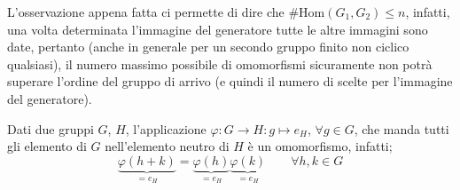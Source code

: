 \documentclass[11pt]{scrartcl}
\begin{document}
L'osservazione appena fatta ci permette di dire che $\#\text{Hom}(G_1,G_2) \leq n$, infatti, una volta determinata l'immagine del generatore tutte le altre immagini sono date, pertanto (anche in generale per un secondo gruppo finito non ciclico qualsiasi), il numero massimo possibile di omomorfismi sicuramente non potrà superare l'ordine del gruppo di arrivo (e quindi il numero di scelte per l'immagine del generatore).

\begin{remark}
Dati due gruppi $G$, $H$, l'applicazione $\varphi: G \longrightarrow H: g \longmapsto e_H$, $\forall g \in G$, che manda tutti gli elemento di $G$ nell'elemento neutro di $H$ è un omomorfismo, infatti;
	\[ \underbrace{\varphi(h+k)}_{= e_H} = \underbrace{\varphi(h)}_{= e_H}\underbrace{\varphi(k)}_{= e_H}
	\qquad
	\forall h,k \in G
	\]
\end{remark}
\end{document}
